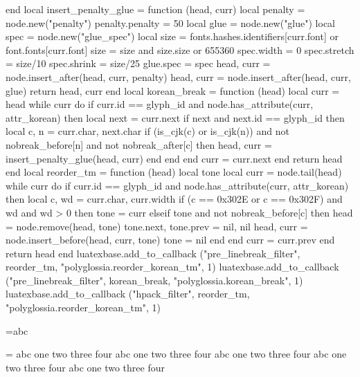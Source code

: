 {end
local insert_penalty_glue = function (head, curr)
    local penalty = node.new("penalty")
    penalty.penalty = 50
    local glue = node.new("glue")
    local spec = node.new("glue_spec")
    local size = fonts.hashes.identifiers[curr.font] or font.fonts[curr.font]
    size = size and size.size or 655360
    spec.width   = 0
    spec.stretch = size/10
    spec.shrink  = size/25
    glue.spec = spec
    head, curr = node.insert_after(head, curr, penalty)
    head, curr = node.insert_after(head, curr, glue)
    return head, curr
end
local korean_break = function (head)
    local curr = head
    while curr do
        if curr.id == glyph_id and node.has_attribute(curr, attr_korean) then
            local next = curr.next
            if next and next.id == glyph_id then
                local c, n = curr.char, next.char
                if (is_cjk(c) or is_cjk(n)) and not nobreak_before[n] and not nobreak_after[c] then
                    head, curr = insert_penalty_glue(head, curr)
                end
            end
        end
        curr = curr.next
    end
    return head
end
local reorder_tm = function (head)
    local tone
    local curr = node.tail(head)
    while curr do
        if curr.id == glyph_id and node.has_attribute(curr, attr_korean) then
            local c, wd = curr.char, curr.width 
            if (c == 0x302E or c == 0x302F) and wd and wd > 0 then
                tone = curr
            elseif tone and not nobreak_before[c] then
                head = node.remove(head, tone)
                tone.next, tone.prev = nil, nil
                head, curr = node.insert_before(head, curr, tone)
                tone = nil
            end
        end
        curr = curr.prev
    end
    return head
end
luatexbase.add_to_callback ("pre_linebreak_filter", reorder_tm, "polyglossia.reorder_korean_tm", 1)
luatexbase.add_to_callback ("pre_linebreak_filter", korean_break, "polyglossia.korean_break", 1)
luatexbase.add_to_callback ("hpack_filter", reorder_tm, "polyglossia.reorder_korean_tm", 1)
}

=\hbox{abc}


=\vbox{\hsize=4cm \def\a{abc one two three four }\a\a\a\a\a}


\bye